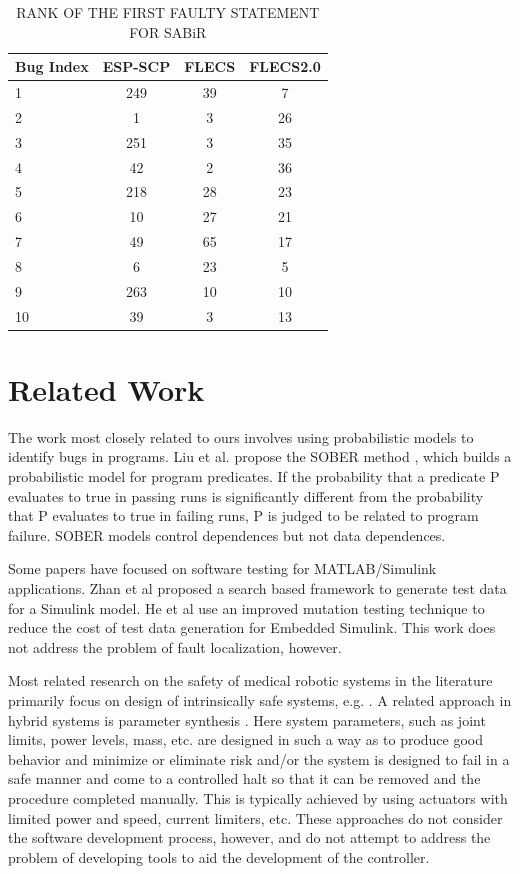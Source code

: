 \begin{table}[htbp!]
\centering
\caption{RANK OF THE FIRST FAULTY STATEMENT FOR SABiR}
\label{flsabir}
      \begin{tabular}{|l|c|c|c|}
      \hline
Bug Index	&	ESP-SCP	&	FLECS	&	FLECS2.0	\\ \hline
1	&	249	&	39	&	7	\\ \hline
2	&	1	&	3	&	26	\\ \hline
3	&	251	&	3	&	35	\\ \hline
4	&	42	&	2	&	36	\\ \hline
5	&	218	&	28	&	23	\\ \hline
6	&	10	&	27	&	21	\\ \hline
7	&	49	&	65	&	17	\\ \hline
8	&	6	&	23	&	5	\\ \hline
9	&	263	&	10	&	10	\\ \hline
10	&	39	&	3	&	13	\\ \hline
\end{tabular}
\end{table}

\section{Related Work}
The work most closely related to ours involves using probabilistic models to identify bugs in programs. Liu et al. propose the SOBER method \cite{liu2006statistical}, which builds a probabilistic model for program predicates. If the probability that a predicate P evaluates to true in passing runs is significantly different from the probability that P evaluates to true in failing runs, P is judged to be related to program failure. SOBER models control dependences but not data dependences. 

Some papers have focused on software testing for MATLAB/Simulink applications. Zhan et al \cite{zhan2008search} proposed a search based framework to generate test data for a Simulink model. He et al \cite{he2011test} use an improved mutation testing technique to reduce the cost of test data generation for Embedded Simulink. This work does not address the problem of fault localization, however.

Most related research on the safety of medical robotic systems in the literature primarily focus on design of intrinsically safe systems, e.g. \cite{taylor2008medical,taylor1996computer,dombre2001intrinsically,duchemin2004medically}. A related approach in hybrid systems is parameter synthesis \cite{donze2009parameter}. Here system parameters, such as joint limits, power levels, mass, etc. are designed in such a way as to produce good behavior and minimize or eliminate risk and/or the system is designed to fail in a safe manner and come to a controlled halt so that it can be removed and the procedure completed manually. This is typically achieved by using actuators with limited power and speed, current limiters, etc. These approaches do not consider the software development process, however, and do not attempt to address the problem of developing tools to aid the development of the controller.

